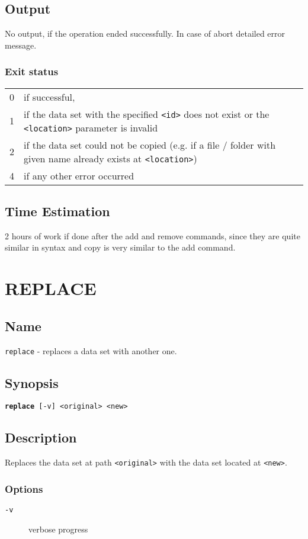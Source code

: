 \documentclass{article} %
\begin{document}
		\subsection*{Output}
		No output, if the operation ended successfully. In case of abort detailed error message.
		\subsubsection*{Exit status}
		\begin{tabular}{ll}
			0 &  if successful,\\ 
			1 &  if the data set with the specified \texttt{<id>} does not exist or the \texttt{<location>} parameter is invalid\\
			2 &  if the data set could not be copied (e.g. if  a file / folder with given name already exists at \texttt{<location>})\\
			4 &  if any other error occurred\\
		\end{tabular}
		
		\subsection*{Time Estimation}
		2 hours of work if done after the add and remove commands, since they are quite similar in syntax and copy is very similar to the add command.\\
		\noindent
		
		\newpage
		\section*{REPLACE}
		\subsection*{Name}
		\texttt{replace} - replaces a data set with another one.
		\subsection*{Synopsis}
		\texttt{\textbf{replace} [-v] <original> <new>}
		\subsection*{Description}
		Replaces the data set at path \texttt{<original>} with the data set located at \texttt{<new>}.\\
		
		\noindent
		\subsubsection*{Options}
		\begin{description}
			\item[\texttt{-v}] verbose progress
		\end{description}
		
\end{document}
